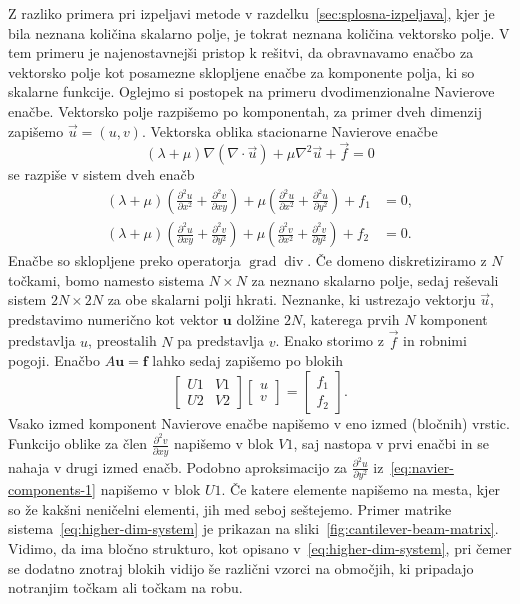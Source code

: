 \documentclass[12pt,a4paper,twoside]{article}
\theoremstyle{definition} %
\theoremstyle{plain} %
\numberwithin{equation}{section}
\renewcommand{\div}{\operatorname{div}}
\newcommand{\grad}{\operatorname{grad}}
\renewcommand{\b}{\boldsymbol}
\newcommand{\dpar}[2]{\ensuremath{\frac{\partial #1}{\partial #2}}}
\newcommand{\vu}{\vec{u}}
\newcommand{\vf}{\vec{f}}
\begin{document}
Z razliko primera pri izpeljavi metode v razdelku~\ref{sec:splosna-izpeljava}, kjer je bila neznana
količina skalarno polje, je tokrat neznana količina vektorsko polje. V tem primeru je
najenostavnejši pristop k rešitvi, da obravnavamo enačbo za vektorsko polje kot posamezne sklopljene
enačbe za komponente polja, ki so skalarne funkcije. Oglejmo si postopek na primeru dvodimenzionalne
Navierove enačbe. Vektorsko polje razpišemo po komponentah, za primer dveh dimenzij zapišemo $\vu =
(u, v)$. Vektorska oblika stacionarne Navierove enačbe
\begin{equation}
  (\lambda+\mu)\nabla(\nabla\cdot \vu) + \mu\nabla^2 \vu + \vf = 0
\end{equation}
se razpiše v sistem dveh enačb
\begin{align}
  \label{eq:navier-components-1}
(\lambda +\mu ) \left(\dpar{^2u}{x^2}+\dpar{^2v}{xy}\right)+\mu  \left(\dpar{^2u}{x^2}+\dpar{^2u}{y^2}\right)+f_1&=0, \\
(\lambda +\mu ) \left(\dpar{^2u}{xy}+\dpar{^2v}{y^2}\right)+\mu  \left(\dpar{^2v}{x^2}+\dpar{^2v}{y^2}\right)+f_2&=0.
\end{align}
Enačbe so sklopljene preko operatorja $\grad\div$. Če domeno diskretiziramo z $N$ točkami, bomo
namesto sistema $N\times N$ za neznano skalarno polje, sedaj reševali sistem $2N\times 2N$ za
obe skalarni polji hkrati. Neznanke, ki ustrezajo vektorju $\vu$, predstavimo numerično kot vektor
$\b{u}$ dolžine $2N$, katerega prvih $N$ komponent predstavlja $u$, preostalih $N$ pa predstavlja $v$.
Enako storimo z $\vf$ in robnimi pogoji. Enačbo $A\b u = \b f$ lahko sedaj zapišemo po blokih
\begin{equation}
  \begin{bmatrix}
    U1 & V1 \\
    U2 & V2
  \end{bmatrix}
  \begin{bmatrix}
    u \\ v
  \end{bmatrix}
  =
  \begin{bmatrix}
    f_1 \\ f_2
  \end{bmatrix}.
  \label{eq:higher-dim-system}
\end{equation}
Vsako izmed komponent Navierove enačbe napišemo v eno izmed (bločnih) vrstic. Funkcijo
oblike za člen $\dpar{^2v}{xy}$ napišemo v blok $V1$, saj nastopa v prvi enačbi in se nahaja v drugi
izmed enačb. Podobno aproksimacijo za $\dpar{^2u}{y^2}$ iz~\eqref{eq:navier-components-1} napišemo
v blok $U1$. Če katere elemente napišemo na mesta, kjer so že kakšni neničelni elementi, jih med
seboj seštejemo. Primer matrike sistema~\eqref{eq:higher-dim-system} je prikazan na
sliki~\ref{fig:cantilever-beam-matrix}. Vidimo, da ima bločno strukturo, kot opisano
v~\eqref{eq:higher-dim-system}, pri čemer se dodatno znotraj blokih vidijo še različni vzorci na
območjih, ki pripadajo notranjim točkam ali točkam na robu.
\end{document}
